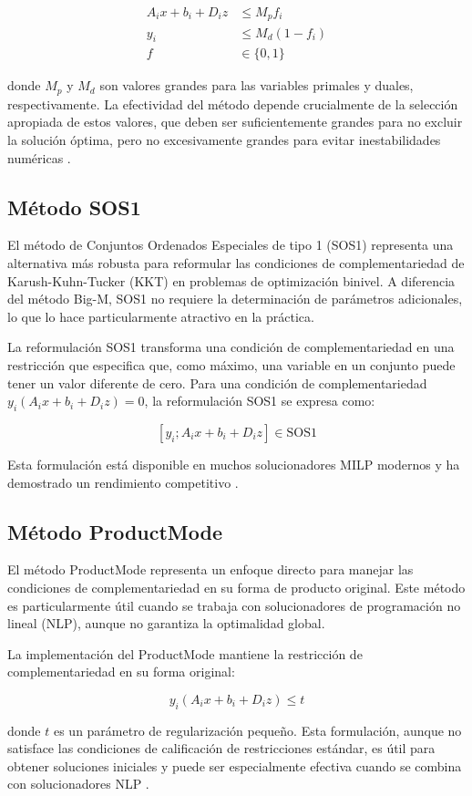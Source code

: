 \begin{align*}
A_ix + b_i + D_iz &\leq M_p f_i \\
y_i &\leq M_d(1 - f_i) \\
f &\in \{0,1\}
\end{align*}

donde $M_p$ y $M_d$ son valores grandes para las variables primales y duales, respectivamente. La efectividad del método depende crucialmente de la selección apropiada de estos valores, que deben ser suficientemente grandes para no excluir la solución óptima, pero no excesivamente grandes para evitar inestabilidades numéricas \cite{BilevelJump}.

\subsection{Método SOS1}

El método de Conjuntos Ordenados Especiales de tipo 1 (SOS1) representa una alternativa más robusta para reformular las condiciones de complementariedad de Karush-Kuhn-Tucker (KKT) en problemas de optimización binivel. A diferencia del método Big-M, SOS1 no requiere la determinación de parámetros adicionales, lo que lo hace particularmente atractivo en la práctica.

La reformulación SOS1 transforma una condición de complementariedad en una restricción que especifica que, como máximo, una variable en un conjunto puede tener un valor diferente de cero. Para una condición de complementariedad $y_i(A_ix + b_i + D_iz) = 0$, la reformulación SOS1 se expresa como:

\[ [y_i ; A_ix + b_i + D_iz] \in \text{SOS1} \]

Esta formulación está disponible en muchos solucionadores MILP modernos y ha demostrado un rendimiento competitivo \cite{BilevelJump}.

\subsection{Método ProductMode}

El método ProductMode representa un enfoque directo para manejar las condiciones de complementariedad en su forma de producto original. Este método es particularmente útil cuando se trabaja con solucionadores de programación no lineal (NLP), aunque no garantiza la optimalidad global.

La implementación del ProductMode mantiene la restricción de complementariedad en su forma original:

\[ y_i(A_ix + b_i + D_iz) \leq t \]

donde $t$ es un parámetro de regularización pequeño. Esta formulación, aunque no satisface las condiciones de calificación de restricciones estándar, es útil para obtener soluciones iniciales y puede ser especialmente efectiva cuando se combina con solucionadores NLP \cite{BilevelJump}.


